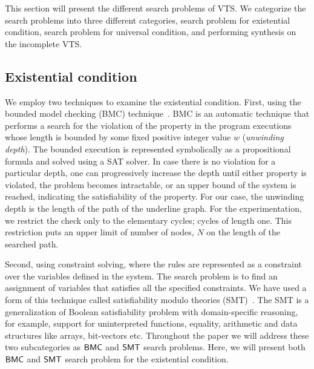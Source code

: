 This section will present the different search problems of VTS.
%
We categorize the search problems into three different categories, search problem for existential condition, search problem for universal condition,
and performing synthesis on the incomplete VTS. 

\subsection{Existential condition}
We employ two techniques to examine the existential condition. 
%
First, using the bounded model checking (BMC) technique~\cite{biere1999symbolic1, biere2003bounded}.
%
%
BMC is an automatic technique that performs a search for the violation of the property in the program executions whose length is bounded by some fixed positive integer value $w$ (\textit{unwinding depth}). 
%
The bounded execution is represented symbolically as a propositional formula and solved using a SAT solver.
%
In case there is no violation for a particular depth, one can progressively increase the depth until either property is violated, the problem becomes intractable, or an upper bound of the system is reached, indicating the satisfiability of the property.
%
For our case, the unwinding depth is the length of the path of the underline graph.
%
%
For the experimentation, we restrict the check only to the elementary cycles; cycles of length one. 
%
This restriction puts an upper limit of number of nodes, $N$ on the length of the searched path. 
%
%

Second, using constraint solving, where the rules are represented as a constraint over the variables defined in the system.
%
The search problem is to find an assignment of variables that satisfies all the specified constraints.
%
We have used a form of this technique called satisfiability modulo theories (SMT)~\cite{nieuwenhuis2006solving, barrett2018satisfiability}.
%
The SMT is a generalization of Boolean satisfiability problem with domain-specific reasoning, for example, support for uninterpreted functions, equality, arithmetic and data structures like arrays, bit-vectors etc. 
%
%
Throughout the paper we will address these two subcategories as $\mathsf{BMC}$ and $\mathsf{SMT}$ search problems.
%
%
Here, we will present both $\mathsf{BMC}$ and $\mathsf{SMT}$ search problem for the existential condition.

